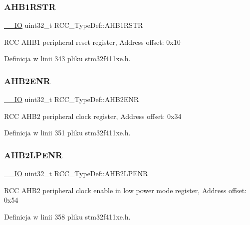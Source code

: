 \subsubsection{\texorpdfstring{A\+H\+B1\+R\+S\+TR}{AHB1RSTR}}
{\footnotesize\ttfamily \hyperlink{core__sc300_8h_aec43007d9998a0a0e01faede4133d6be}{\+\_\+\+\_\+\+IO} uint32\+\_\+t R\+C\+C\+\_\+\+Type\+Def\+::\+A\+H\+B1\+R\+S\+TR}

R\+CC A\+H\+B1 peripheral reset register, Address offset\+: 0x10 

Definicja w linii 343 pliku stm32f411xe.\+h.

\mbox{\label{struct_r_c_c___type_def_af326cb98c318fc08894a8dd79c2c675f}} 
\subsubsection{\texorpdfstring{A\+H\+B2\+E\+NR}{AHB2ENR}}
{\footnotesize\ttfamily \hyperlink{core__sc300_8h_aec43007d9998a0a0e01faede4133d6be}{\+\_\+\+\_\+\+IO} uint32\+\_\+t R\+C\+C\+\_\+\+Type\+Def\+::\+A\+H\+B2\+E\+NR}

R\+CC A\+H\+B2 peripheral clock register, Address offset\+: 0x34 

Definicja w linii 351 pliku stm32f411xe.\+h.

\mbox{\label{struct_r_c_c___type_def_a1de344446cba3f4dd15c56fbe20eb0dd}} 
\subsubsection{\texorpdfstring{A\+H\+B2\+L\+P\+E\+NR}{AHB2LPENR}}
{\footnotesize\ttfamily \hyperlink{core__sc300_8h_aec43007d9998a0a0e01faede4133d6be}{\+\_\+\+\_\+\+IO} uint32\+\_\+t R\+C\+C\+\_\+\+Type\+Def\+::\+A\+H\+B2\+L\+P\+E\+NR}

R\+CC A\+H\+B2 peripheral clock enable in low power mode register, Address offset\+: 0x54 

Definicja w linii 358 pliku stm32f411xe.\+h.

\mbox{\label{struct_r_c_c___type_def_a343e0230ded55920ff2a04fbde0e5bcd}} 
